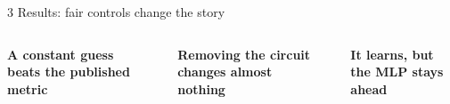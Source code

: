 \documentclass[final]{beamer}
\newlength{\sepwidth}
\newlength{\colwidth}
\begin{document}
\begin{frame}[t]
\vspace{1cm plus 1fill}

\begin{alertblock}{3 Results: fair controls change the story}
\vspace{0.4cm}
\begin{columns}[t,totalwidth=\textwidth]
  \begin{column}{\colwidth}
    \vspace{0.35cm}
    \textbf{A constant guess beats the published metric}\par
    \vspace{0.25cm}
    
  \end{column}
  \begin{column}{\sepwidth}\end{column}
  \begin{column}{\colwidth}
    \vspace{0.35cm}
    \textbf{Removing the circuit changes almost nothing}\par
    \vspace{0.25cm}
    
  \end{column}
  \begin{column}{\sepwidth}\end{column}
  \begin{column}{\colwidth}
    \vspace{0.35cm}
    \textbf{It learns, but the MLP stays ahead}\par
    \vspace{0.25cm}
    
  \end{column}
\end{columns}
\end{alertblock}

\vspace{1cm plus 1fill}


\end{frame}
\end{document}
